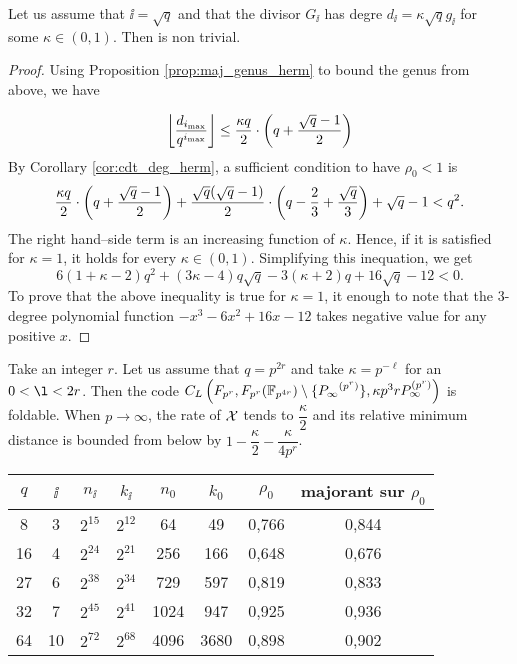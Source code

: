 \documentclass[10pt]{article}
\begin{document}
\begin{proposition}
	Let us assume that $\ii=\sqrt{q}$ and that the divisor $G_{\ii}$ has degre $d_{\ii} = \kappa \sqrt{q}g_{\ii}$ for some $\kappa \in (0,1)$.
	Then  is non trivial.
\end{proposition}
\begin{proof}
	Using Proposition \ref{prop:maj_genus_herm} to bound the genus from above, we have
	
	\[ \left\lfloor\dfrac{d_{i_{\rm{max}}}}{q^{i_{\rm{max}}}}\right\rfloor \leq  \dfrac{\kappa q}{2} \cdot \left( q + \dfrac{\sqrt{q}-1}{2} \right)\]
	By Corollary \ref{cor:cdt_deg_herm}, a sufficient condition to have $\rho_0 < 1$ is
	\[\dfrac{\kappa q}{2} \cdot \left( q + \dfrac{\sqrt{q}-1}{2} \right)+\dfrac{\sqrt{q}(\sqrt{q}-1)}{2}\cdot \left(q-\frac{2}{3} + \frac{\sqrt{q}}{3}\right) + \sqrt{q}-1 < q^2.\]
	The right hand--side term is an increasing function of $\kappa$. Hence, if it is satisfied for $\kappa=1$, it holds for every $\kappa \in (0,1)$. Simplifying this inequation, we get 
	\[6(1+\kappa - 2) q^2 + (3\kappa-4)q\sqrt{q}-3(\kappa+2)q+16\sqrt{q}-12 <0.\]
	To prove that the above inequality is true for $\kappa=1$, it enough to note that the 3-degree polynomial function $-x^3-6x^2+16x-12$ takes negative value for any positive $x$.
\end{proof}

Take an integer $r$. Let us assume that $q=p^{2r}$ and take $\kappa=p^{-\ell}$ for an $0<\l<2r$. Then the code $C_L\left(F_{p^r},F_{p^r}( \mathbb{F}_{p^{4r}} )\setminus\{ {P_\infty}^{(p^r)} \}, \kappa p^3rP_\infty^{(p^r)}\right)$ is foldable. When $p \rightarrow \infty$, the rate of $\mathcal{X}$ tends to $\dfrac{\kappa}{2}$ and its relative minimum distance is bounded from below by $1-\dfrac{\kappa}{2}-\dfrac{\kappa}{4p^r}$.


\begin{center}
\begin{tabular}{|c|c|c|c|c|c|c|c|}
\hline
$q$ & $\ii$ & $n_{\ii}$ & $k_{\ii}$ & $n_0$ & $k_0$ & $\rho_0$ & majorant sur $\rho_0$ \\ 
\hline
8 & 3 & $2^{15}$ & $2^{12}$ & 64 & 49 & 0,766 & 0,844 \\
\hline
16 & 4 & $2^{24}$ & $2^{21}$ & 256 & 166 & 0,648 & 0,676 \\
\hline
27 & 6 & $2^{38}$ & $2^{34}$ & 729 & 597 & 0,819 & 0,833 \\
\hline
32 & 7 & $2^{45}$ & $2^{41}$ & 1024 & 947 & 0,925 & 0,936 \\
\hline
64 & 10 & $2^{72}$ & $2^{68}$ & 4096 & 3680 & 0,898 & 0,902 \\
\hline
\end{tabular}
\end{center}

\newpage



\end{document}

